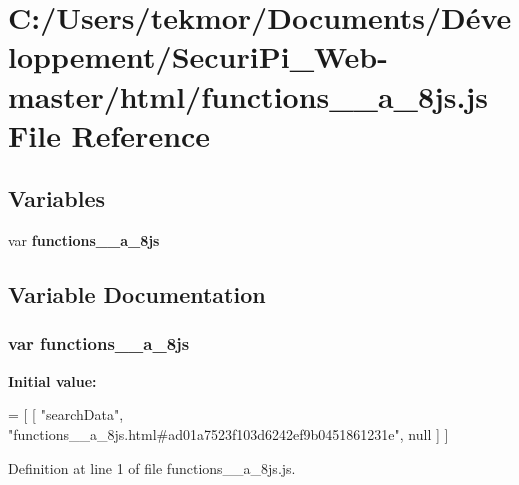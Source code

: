 \section{C\+:/\+Users/tekmor/\+Documents/\+Développement/\+Securi\+Pi\+\_\+\+Web-\/master/html/functions\+\_\+\+\_\+a\+\_\+8js.js File Reference}
\label{functions____a__8js_8js}
\subsection*{Variables}
\begin{DoxyCompactItemize}
\item 
var {\bf functions\+\_\+\+\_\+a\+\_\+8js}
\end{DoxyCompactItemize}


\subsection{Variable Documentation}
\subsubsection[{functions\+\_\+\+\_\+a\+\_\+8js}]{\setlength{\rightskip}{0pt plus 5cm}var functions\+\_\+\+\_\+a\+\_\+8js}\label{functions____a__8js_8js_a45d78c234b07ece73611321feaf6b556}
{\bfseries Initial value\+:}
\begin{DoxyCode}
=
[
    [ \textcolor{stringliteral}{"searchData"}, \textcolor{stringliteral}{"functions\_\_a\_8js.html#ad01a7523f103d6242ef9b0451861231e"}, null ]
]
\end{DoxyCode}


Definition at line 1 of file functions\+\_\+\+\_\+a\+\_\+8js.\+js.

